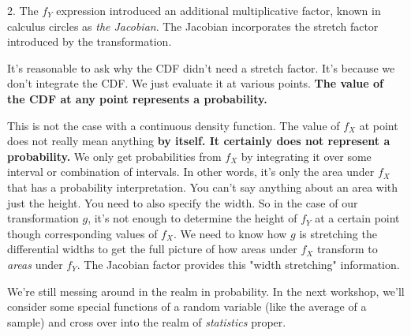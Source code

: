 \documentclass[]{article}
\begin{document}
2. The $f_Y$ expression introduced an additional multiplicative
   factor, known in calculus circles as \emph{the Jacobian}.  The
   Jacobian incorporates the stretch factor introduced by the
   transformation.

It's reasonable to ask why the CDF didn't need a stretch factor.
It's because we don't integrate the CDF.  We just evaluate it at
various points.
\textbf{The value of the CDF at any point represents a probability.}

This is not the case with a continuous density function.  The
value of $f_X$ at point does not really mean anything
\textbf{by itself.
It certainly does not represent a probability.}  We only get
probabilities from $f_X$ by integrating it over some interval
or combination of intervals.  In other words, it's only the
area under $f_X$ that has a probability interpretation.  You
can't say anything about an area with just the height.  You
need to also specify the width.  So in the case of our transformation
$g$, it's not enough to determine the height of $f_Y$ at a certain
point though corresponding values of $f_X$.  We need to know how
$g$ is stretching the differential widths to get the full picture
of how areas under $f_X$ transform to \emph{areas} under $f_Y$.  The
Jacobian factor provides this "width stretching" information.

We're still messing around in the realm in probability.  In the next
workshop, we'll consider some special functions of a random
variable (like the average of a sample) and cross over into the
realm of \emph{statistics} proper.
\end{document}
